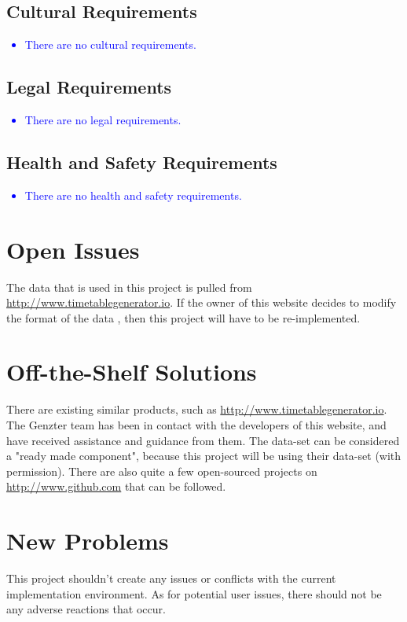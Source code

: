 \documentclass[12pt]{article}
\begin{document}
\subsection{Cultural Requirements}
\textcolor{blue}{
\begin{itemize}
    \item There are no cultural requirements.
\end{itemize}
}
\subsection{Legal Requirements}
\textcolor{blue}{
\begin{itemize}
    \item There are no legal requirements.
\end{itemize}
}
\subsection{Health and Safety Requirements}
\textcolor{blue}{
\begin{itemize}
    \item There are no health and safety requirements.
\end{itemize}
}
\newpage

\section{Open Issues}

\tab The data that is used in this project is pulled from \url{http://www.timetablegenerator.io}. If the owner of this website decides to modify the format of the data , then this project will have to be re-implemented. 


\section{Off-the-Shelf Solutions}
There are existing similar products, such as \url{http://www.timetablegenerator.io}. The Genzter team has been in contact with the developers of this website, and have received assistance and guidance from them. The data-set can be considered a "ready made component", because this project will be using their data-set (with permission). There are also quite a few open-sourced projects on \url{http://www.github.com} that can be followed.

\section{New Problems}
This project shouldn't create any issues or conflicts with the current implementation environment. As for potential user issues, there should not be any adverse reactions that occur.
\end{document}

